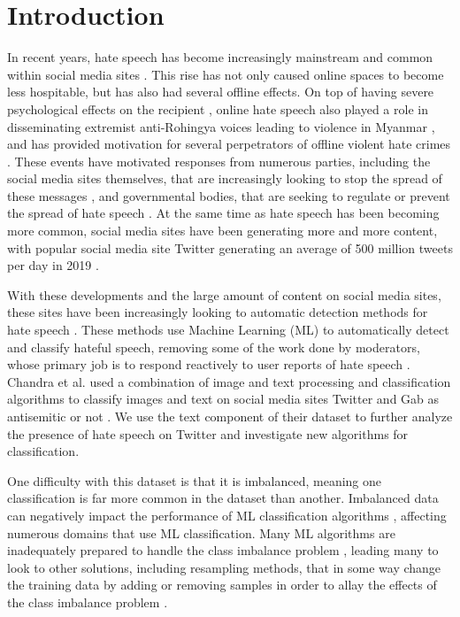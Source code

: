 \documentclass[runningheads]{llncs}
\begin{document}
\section{Introduction}
In recent years, hate speech has become increasingly mainstream and common within social media sites \cite{siegel}. This rise has not only caused online spaces to become less hospitable, but has also had several offline effects. On top of having severe psychological effects on the recipient \cite{siegel}, online hate speech also played a role in disseminating extremist anti-Rohingya voices leading to violence in Myanmar \cite{green}, and has provided motivation for several perpetrators of offline violent hate crimes \cite{siegel}. These events have motivated responses from numerous parties, including the social media sites themselves, that are increasingly looking to stop the spread of these messages \cite{ullmann}, and governmental bodies, that are seeking to regulate or prevent the spread of hate speech \cite{banks}. At the same time as hate speech has been becoming more common, social media sites have been generating more and more content, with popular social media site Twitter generating an average of 500 million tweets per day in 2019 \cite{pereira}.

With these developments and the large amount of content on social media sites, these sites have been increasingly looking to automatic detection methods for hate speech \cite{ullmann}. These methods use Machine Learning (ML) to automatically detect and classify hateful speech, removing some of the work done by moderators, whose primary job is to respond reactively to user reports of hate speech \cite{ullmann}. Chandra et al. \cite{chandra} used a combination of image and text processing and classification algorithms to classify images and text on social media sites Twitter and Gab as antisemitic or not \cite{chandra}. We use the text component of their dataset to further analyze the presence of hate speech on Twitter and investigate new algorithms for classification.

One difficulty with this dataset is that it is imbalanced, meaning one classification is far more common in the dataset than another. Imbalanced data can negatively impact the performance of ML classification algorithms \cite{sun}, affecting numerous domains that use ML classification. Many ML algorithms are inadequately prepared to handle the class imbalance problem \cite{sun}, leading many to look to other solutions, including resampling methods, that in some way change the training data by adding or removing samples in order to allay the effects of the class imbalance problem \cite{japkowicz}.
\end{document}
